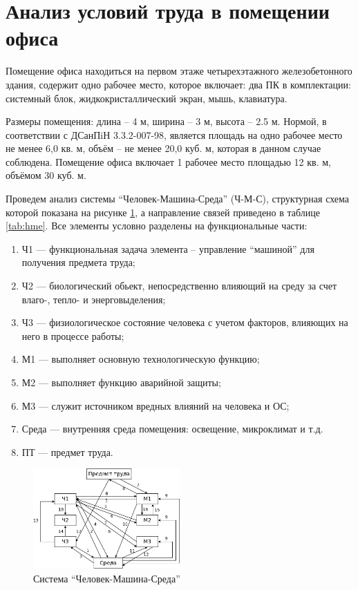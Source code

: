 \section{Анализ условий труда в помещении офиса}

Помещение офиса находиться на первом этаже четырехэтажного железобетонного здания,
содержит одно рабочее место, которое включает: 
два ПК в комплектации: системный блок, жидкокристаллический экран, мышь, клавиатура.

Размеры помещения: длина -- 4 м, ширина -- 3 м, высота -- 2.5 м. Нормой, в соответствии с ДСанПiН 3.3.2-007-98, 
является площадь на одно рабочее место не менее 6,0 кв. м, объём -- не менее 20,0 куб. м, которая в данном случае
соблюдена. Помещение офиса включает 1 рабочее место площадью 12 кв. м, объёмом 30 куб. м.

 Проведем анализ системы ``Человек-Машина-Среда'' (Ч-М-С), структурная схема которой показана на рисунке 
 \ref{fig:hme},
 а направление связей приведено в таблице \ref{tab:hme}. Все элементы условно разделены на функциональные части:

\begin{enumerate}
    \item Ч1 --- функциональная задача элемента -- управление ``машиной'' для получения предмета труда;
    \item Ч2 --- биологический обьект, непосредственно влияющий на среду за счет влаго-, тепло- и энерговыделения;
    \item Ч3 --- физиологическое состояние человека с учетом факторов, влияющих на него в процессе работы;
    \item М1 --- выполняет основную технологическую функцию;
    \item М2 --- выполняет функцию аварийной защиты;
    \item М3 --- служит источником вредных влияний на человека и ОС;
    \item Среда --- внутренняя среда помещения: освещение, микроклимат и т.д.
    \item ПТ --- предмет труда.
\end{enumerate}

\begin{figure}[!ht]
    \centering
    \includegraphics[width=0.5\textwidth]{graphics/hme.png}
    \caption{Система ``Человек-Машина-Среда''}
    \label{fig:hme}
\end{figure}

